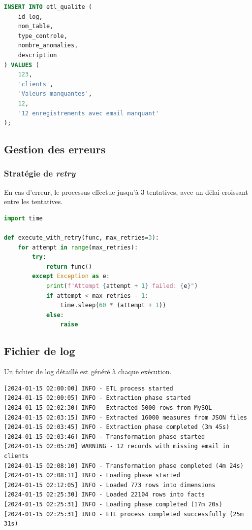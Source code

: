 \documentclass[12pt,a4paper]{report}
\begin{document}
\begin{lstlisting}[language=SQL, caption=Exemple d'insertion dans etl\_qualite]
INSERT INTO etl_qualite (
    id_log,
    nom_table,
    type_controle,
    nombre_anomalies,
    description
) VALUES (
    123,
    'clients',
    'Valeurs manquantes',
    12,
    '12 enregistrements avec email manquant'
);
\end{lstlisting}

\subsection{Gestion des erreurs}

\subsubsection{Stratégie de \textit{retry}}

En cas d'erreur, le processus effectue jusqu'à 3 tentatives, avec un délai croissant entre les tentatives.

\begin{lstlisting}[language=Python, caption=Stratégie de retry (exemple)]
import time

def execute_with_retry(func, max_retries=3):
    for attempt in range(max_retries):
        try:
            return func()
        except Exception as e:
            print(f"Attempt {attempt + 1} failed: {e}")
            if attempt < max_retries - 1:
                time.sleep(60 * (attempt + 1))
            else:
                raise
\end{lstlisting}

\subsection{Fichier de log}

Un fichier de log détaillé est généré à chaque exécution.

\begin{lstlisting}[caption=Exemple de log ETL]
[2024-01-15 02:00:00] INFO - ETL process started
[2024-01-15 02:00:05] INFO - Extraction phase started
[2024-01-15 02:02:30] INFO - Extracted 5000 rows from MySQL
[2024-01-15 02:03:15] INFO - Extracted 16000 measures from JSON files
[2024-01-15 02:03:45] INFO - Extraction phase completed (3m 45s)
[2024-01-15 02:03:46] INFO - Transformation phase started
[2024-01-15 02:05:20] WARNING - 12 records with missing email in clients
[2024-01-15 02:08:10] INFO - Transformation phase completed (4m 24s)
[2024-01-15 02:08:11] INFO - Loading phase started
[2024-01-15 02:12:05] INFO - Loaded 773 rows into dimensions
[2024-01-15 02:25:30] INFO - Loaded 22104 rows into facts
[2024-01-15 02:25:31] INFO - Loading phase completed (17m 20s)
[2024-01-15 02:25:31] INFO - ETL process completed successfully (25m 31s)
\end{lstlisting}
\end{document}
